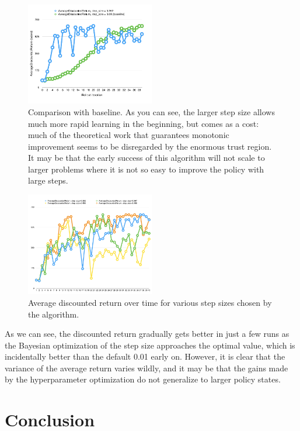 \documentclass[12pt]{article}
\theoremstyle{plain}
\begin{document}
\begin{figure}[H]
  \centering
  \includegraphics[width=0.5\textwidth]{new_results.png}

  \caption{Comparison with baseline. As you can see, the larger step size allows much more rapid learning in the beginning, but comes as a cost: much of the theoretical work that guarantees monotonic improvement seems to be disregarded by the enormous trust region. It may be that the early success of this algorithm will not scale to larger problems where it is not so easy to improve the policy with large steps.}
\end{figure}


\begin{figure}[H]
  \centering
  \includegraphics[width=0.5\textwidth]{results.png}

  \caption{Average discounted return over time for various step sizes chosen by the algorithm.}
\end{figure}


As we can see, the discounted return gradually gets better in just a few runs as the Bayesian optimization of the step size approaches the optimal value, which is incidentally better than the default 0.01 early on. However, it is clear that the variance of the average return varies wildly, and it may be that the gains made by the hyperparameter optimization do not generalize to larger policy states.

\section{Conclusion}
\end{document}

